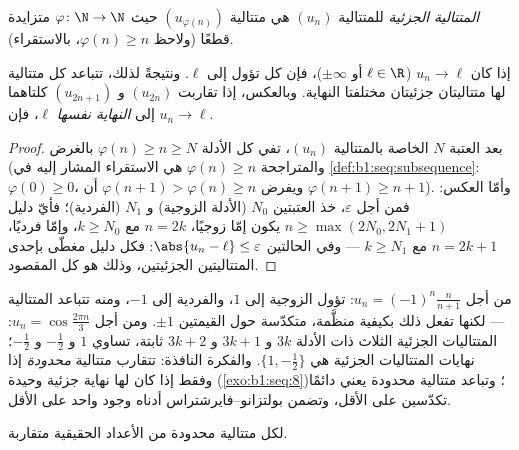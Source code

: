 \begin{definition}\label{def:b1:seq:subsequence}
\emph{المتتالية الجزئية} للمتتالية $(u_n)$ هي متتالية
$(u_{\varphi(n)})$ حيث $\varphi \colon \N \to \N$ متزايدة
قطعًا (ولاحظ $\varphi(n) \geq n$، بالاستقراء).
\end{definition}

\begin{proposition}\label{prop:b1:seq:subsequences}
إذا كان $u_n \to \ell$ ($\ell \in \R$ أو $\pm\infty$)، فإن كل 
تؤول إلى $\ell$. ونتيجةً لذلك، تتباعد كل متتالية لها متتاليتان جزئيتان
مختلفتا النهاية. وبالعكس، إذا تقاربت $(u_{2n})$ و
$(u_{2n+1})$ كلتاهما إلى \emph{النهاية نفسها} $\ell$، فإن $u_n \to
\ell$.
\end{proposition}

\begin{proof}
بعد العتبة $N$ الخاصة بالمتتالية $(u_n)$، تفي كل الأدلة $\varphi(n) \geq n
\geq N$ بالغرض (والمتراجحة $\varphi(n) \geq n$ هي
الاستقراء المشار إليه في \cref{def:b1:seq:subsequence}: $\varphi(0)
\geq 0$، ويفرض $\varphi(n+1) > \varphi(n) \geq n$ أن
$\varphi(n+1) \geq n + 1$). وأمّا العكس: فمن أجل
$\varepsilon$، خذ العتبتين $N_0$ (الأدلة الزوجية) و $N_1$
(الفردية)؛ فأيّ دليل $n \geq \max(2N_0, 2N_1 + 1)$ يكون
إمّا زوجيًا، $n = 2k$ مع $k \geq N_0$، وإمّا فرديًا، $n = 2k+1$ مع
$k \geq N_1$ --- وفي الحالتين $\abs{u_n - \ell} \leq
\varepsilon$: فكل دليل مغطّى بإحدى المتتاليتين
الجزئيتين، وذلك هو كل المقصود.
\end{proof}

\begin{example}\label{ex:b1:seq:sublimits}
من أجل $u_n = (-1)^n \frac{n}{n+1}$: تؤول  الزوجية إلى
$1$، والفردية إلى $-1$، ومنه تتباعد المتتالية --- لكنها تفعل
ذلك بكيفية منظَّمة، متكدّسة حول القيمتين $\pm 1$.
ومن أجل $u_n = \cos\frac{2\pi n}{3}$: المتتاليات الجزئية الثلاث ذات
الأدلة $3k$ و $3k + 1$ و $3k + 2$ ثابتة، تساوي $1$ و
$-\frac12$ و $-\frac12$؛  نهايات المتتاليات الجزئية هي $\{1,
-\frac12\}$. والفكرة النافذة: تتقارب متتالية \emph{محدودة}
إذا وفقط إذا كان لها نهاية جزئية وحيدة
(\cref{exo:b1:seq:8})؛ وتباعد متتالية محدودة يعني دائمًا
تكدّسين على الأقل، وتضمن بولتزانو--فايرشتراس أدناه
وجود واحد على الأقل.
\end{example}

\begin{theorem}\label{thm:b1:seq:bw}
لكل متتالية محدودة من الأعداد الحقيقية 
متقاربة.
\end{theorem}

